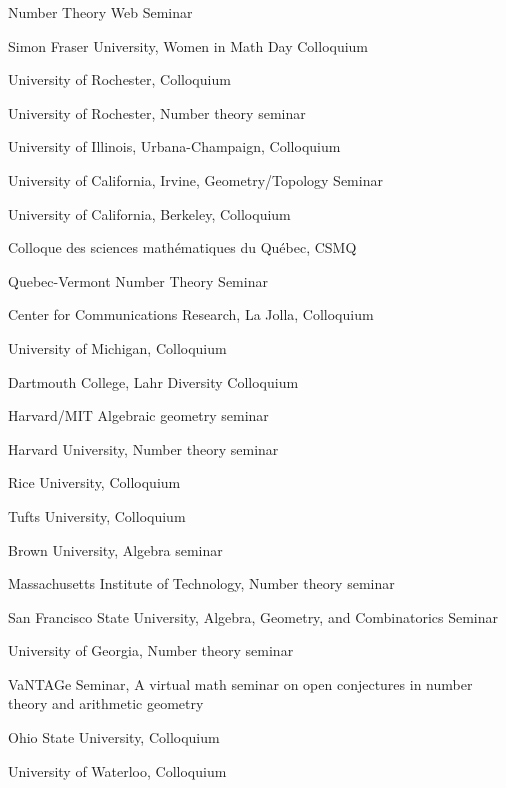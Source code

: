 \documentclass[12pt]{article}
\newenvironment{date_section}
	{
	\vspace{-1ex}
	\leftmargini = 15ex
	 \begin{itemize}[
		 labelsep = *,
		 labelwidth = 9ex,
		 labelindent = 0ex,
		 itemindent = !,
		 font=\normalfont, 
		 align=parleft
		 ]
		{}
		\itemsep=-1.5mm}
	{\end{itemize}\vspace{-2ex}}
\newcommand{\yearmo}[2]{
	\item[ 
		{\makebox[1ex][r]{#1}}
		\hspace{1ex}
		{\makebox[1ex][l]{#2} }
		] }
\begin{document}
		\begin{date_section}
			\yearmo{}{2026} Number Theory Web Seminar 
			\yearmo{}{} Simon Fraser University, Women in Math Day Colloquium 
			\yearmo{}{2025} University of Rochester, Colloquium 
			\yearmo{}{} University of Rochester, Number theory seminar 
			\yearmo{}{} University of Illinois, Urbana-Champaign, Colloquium 
			
			\yearmo{}{} University of California, Irvine, Geometry/Topology Seminar
			
			\yearmo{}{} University of California, Berkeley, Colloquium
		
			\yearmo{}{2024}
			Colloque des sciences math\'ematiques du Qu\'ebec, CSMQ 

			\yearmo{}{}
			Quebec-Vermont Number Theory Seminar 

			\yearmo{}{}
			Center for Communications Research, La Jolla, Colloquium 

	\yearmo{}{2023}
		University of Michigan, Colloquium 

            \yearmo{}{2022}
			Dartmouth College, Lahr Diversity Colloquium

			\yearmo{}{}
			Harvard/MIT  Algebraic geometry seminar

            \yearmo{}{}
			Harvard University, Number theory seminar

            \yearmo{}{}
			Rice University, Colloquium

            \yearmo{}{}
			Tufts University, Colloquium

            \yearmo{}{2021}
			Brown University, Algebra seminar

			\yearmo{}{}
			Massachusetts Institute of Technology, Number theory seminar

			\yearmo{}{}
            San Francisco State University, Algebra, Geometry, and Combinatorics Seminar

            \yearmo{}{}
                University of Georgia, Number theory seminar

            \yearmo{}{}
                VaNTAGe Seminar, A virtual math seminar on open conjectures in
                number theory and arithmetic geometry

            \yearmo{}{}
                Ohio State University, Colloquium

            \yearmo{}{}
                University of Waterloo, Colloquium


\end{date_section}
\end{document}
